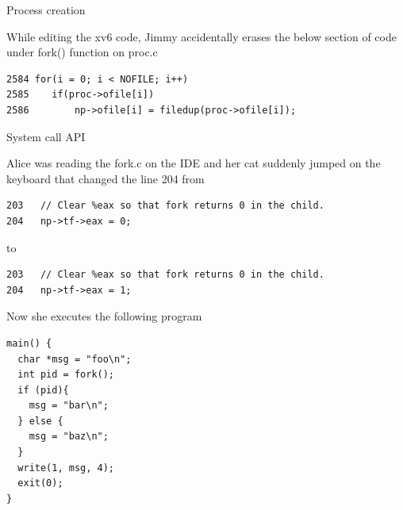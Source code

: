 \documentclass[11pt]{exam}
\begin{document}
\begin{questions}
\newpage
\addpoints
\question Process creation


While editing the xv6 code, Jimmy accidentally erases the below section of
code under fork() function on proc.c
\begin{verbatim}
2584 for(i = 0; i < NOFILE; i++)
2585    if(proc->ofile[i])
2586        np->ofile[i] = filedup(proc->ofile[i]);
\end{verbatim}


\newpage
\addpoints
\question System call API

Alice was reading the fork.c on the IDE and her cat suddenly jumped on the keyboard
that changed the line 204 from 
\begin{verbatim}
203   // Clear %eax so that fork returns 0 in the child.
204   np->tf->eax = 0;
\end{verbatim}
to
\begin{verbatim}
203   // Clear %eax so that fork returns 0 in the child.
204   np->tf->eax = 1;
\end{verbatim}

Now she executes the following program
\begin{verbatim}
main() {
  char *msg = "foo\n";
  int pid = fork();
  if (pid){
    msg = "bar\n";
  } else {
    msg = "baz\n";
  }
  write(1, msg, 4);
  exit(0);
}
\end{verbatim}

\end{questions}
\end{document}
